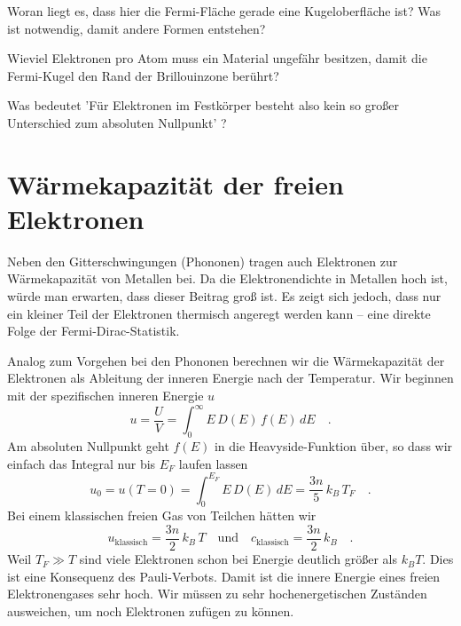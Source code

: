 \begin{questions} 
\item Woran liegt es, dass hier die Fermi-Fläche gerade eine Kugeloberfläche ist? Was ist notwendig, damit andere Formen  entstehen?
\item Wieviel Elektronen pro Atom muss ein Material ungefähr besitzen, damit die Fermi-Kugel den Rand der Brillouinzone berührt?
\item Was bedeutet 'Für Elektronen im Festkörper besteht also kein so großer Unterschied zum absoluten Nullpunkt' ?
\end{questions}



\section*{Wärmekapazität der freien Elektronen}

Neben den Gitterschwingungen (Phononen) tragen auch Elektronen zur Wärmekapazität von Metallen bei. Da die Elektronendichte in Metallen hoch ist, würde man erwarten, dass dieser Beitrag groß ist. Es zeigt sich jedoch, dass nur ein kleiner Teil der Elektronen thermisch angeregt werden kann -- eine direkte Folge der Fermi-Dirac-Statistik.

Analog zum Vorgehen bei den Phononen berechnen wir die Wärmekapazität der Elektronen als Ableitung der inneren Energie nach der Temperatur. Wir beginnen mit der spezifischen inneren Energie $u$
\begin{equation}
    u = \frac{U}{V} = \int_0^\infty E \, D(E) \, f(E) \,  dE \quad .
\end{equation}
Am absoluten Nullpunkt geht $f(E)$  in die Heavyside-Funktion über, so dass wir einfach das Integral nur bis $E_F$ laufen lassen
\begin{equation}
    u_0 = u(T=0) = \int_0^{E_F} E \, D(E) \, dE = \frac{3n}{5} \, k_B \, T_F \quad .
\end{equation}
Bei einem klassischen freien Gas von Teilchen hätten wir 
\begin{equation}
    u_\text{klassisch} = \frac{3 n}{2} \, k_B \, T \quad \text{und} \quad c_\text{klassisch} = \frac{3 n}{2} \, k_B  \quad .
\end{equation}
Weil $T_F \gg T$ sind viele Elektronen schon bei Energie deutlich größer als $k_B T$. Dies ist eine Konsequenz des  Pauli-Verbots. Damit ist die  innere Energie eines freien Elektronengases sehr hoch. Wir müssen zu sehr hochenergetischen Zuständen ausweichen, um noch Elektronen zufügen zu können.

